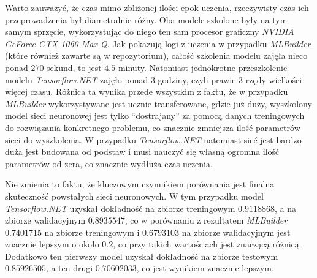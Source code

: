 Warto zauważyć, że czas mimo zbliżonej ilości epok uczenia, rzeczywisty czas ich przeprowadzenia był diametralnie różny.
Oba modele szkolone były na tym samym sprzęcie, wykorzystując do niego ten sam procesor graficzny \emph{NVIDIA GeForce GTX 1060 Max-Q}.
Jak pokazują logi z uczenia w przypadku \emph{MLBuilder} (które również zawarte są w repozytorium), całość szkolenia modelu zajęła nieco ponad $270$ sekund, to jest $4.5$ minuty.
Natomiast jednokrotne przeszkolenie modelu \emph{Tensorflow.NET} zajęło ponad 3 godziny, czyli prawie 3 rzędy wielkości więcej czasu.
Różnica ta wynika przede wszystkim z faktu, że w przypadku \emph{MLBuilder} wykorzystywane jest ucznie transferowane, gdzie już duży, wyszkolony model sieci neuronowej jest tylko ``dostrajany'' za pomocą danych treningowych do rozwiązania konkretnego problemu, co znacznie zmniejsza ilość parametrów sieci do wyszkolenia.
W przypadku \emph{Tensorflow.NET} natomiast sieć jest bardzo duża jest budowana od podstaw i musi nauczyć się własną ogromna ilość parametrów od zera, co znacznie wydłuża czas uczenia.

Nie zmienia to faktu, że kluczowym czynnikiem porównania jest finalna skuteczność powstałych sieci neuronowych.
W tym przypadku model \emph{Tensorflow.NET} uzyskał dokładność na zbiorze treningowym $0.9118868$, a na zbiorze walidacyjnym $0.8935547$, co w porównaniu z rezultatem \emph{MLBuilder} $0.7401715$ na zbiorze treningowym i $0.6793103$ na zbiorze walidacyjnym jest znacznie lepszym o około $0.2$, co przy takich wartościach jest znaczącą różnicą.
Dodatkowo ten pierwszy model uzyskał dokładność na zbiorze testowym $0.85926505$, a ten drugi $0.70602033$, co jest wynikiem znacznie lepszym.

